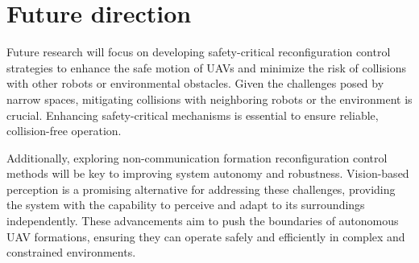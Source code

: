 \section{Future direction}
Future research will focus on developing safety-critical reconfiguration control strategies to enhance the safe motion of UAVs and minimize the risk of collisions with other robots or environmental obstacles. Given the challenges posed by narrow spaces, mitigating collisions with neighboring robots or the environment is crucial. Enhancing safety-critical mechanisms is essential to ensure reliable, collision-free operation.

Additionally, exploring non-communication formation reconfiguration control methods will be key to improving system autonomy and robustness. Vision-based perception is a promising alternative for addressing these challenges, providing the system with the capability to perceive and adapt to its surroundings independently. These advancements aim to push the boundaries of autonomous UAV formations, ensuring they can operate safely and efficiently in complex and constrained environments.